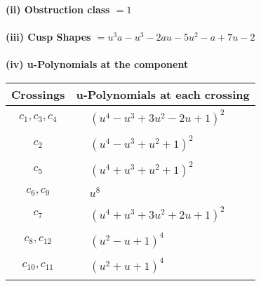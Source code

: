 \documentclass[1p]{elsarticle_modified}
\theoremstyle{definition}
\begin{document}
\flushleft \textbf{(ii) Obstruction class $= 1$}\\~\\
\flushleft \textbf{(iii) Cusp Shapes $= u^3 a- u^3-2 a u-5 u^2- a+7 u-2$}\\~\\
\newpage\renewcommand{\arraystretch}{1}
\flushleft \textbf{(iv) u-Polynomials at the component}\newline \\
\begin{tabular}{m{50pt}|m{274pt}}
Crossings & \hspace{64pt}u-Polynomials at each crossing \\
\hline $$\begin{aligned}c_{1},c_{3},c_{4}\end{aligned}$$&$\begin{aligned}
&(u^4- u^3+3 u^2-2 u+1)^2
\end{aligned}$\\
\hline $$\begin{aligned}c_{2}\end{aligned}$$&$\begin{aligned}
&(u^4- u^3+u^2+1)^2
\end{aligned}$\\
\hline $$\begin{aligned}c_{5}\end{aligned}$$&$\begin{aligned}
&(u^4+u^3+u^2+1)^2
\end{aligned}$\\
\hline $$\begin{aligned}c_{6},c_{9}\end{aligned}$$&$\begin{aligned}
&u^8
\end{aligned}$\\
\hline $$\begin{aligned}c_{7}\end{aligned}$$&$\begin{aligned}
&(u^4+u^3+3 u^2+2 u+1)^2
\end{aligned}$\\
\hline $$\begin{aligned}c_{8},c_{12}\end{aligned}$$&$\begin{aligned}
&(u^2- u+1)^4
\end{aligned}$\\
\hline $$\begin{aligned}c_{10},c_{11}\end{aligned}$$&$\begin{aligned}
&(u^2+u+1)^4
\end{aligned}$\\
\hline
\end{tabular}\\~\\
\end{document}
